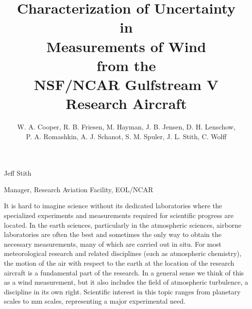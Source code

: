 \documentclass[12pt,twoside,english]{article}\usepackage[]{graphicx}\usepackage[]{color}
\begin{document}
\title{Characterization of Uncertainty \\
 in \\Measurements of Wind\\
 from the \\NSF/NCAR Gulfstream V Research Aircraft}


\author{W. A. Cooper, R. B. Friesen, M. Hayman, J. B. Jensen, D. H. Lenschow, \\P. A. Romashkin, A. J. Schanot, S. M. Spuler, J. L. Stith, C. Wolff}


\thispagestyle{empty}
\maketitle
\vfill{}
\eject%
\cleardoublepage
{}



\renewcommand{\contentsname}{Table of Contents}
{}
\tableofcontents{}
\clearpage
{}
{}
\listoffigures
\clearpage
{}
{}
\listoftables
\cleardoublepage
{}
{}
\subsection*{}
{\centering
Jeff Stith
\par}

{\centering
Manager, Research Aviation Facility, EOL/NCAR
\par}


\bigskip

It is hard to imagine science without its dedicated laboratories where
the specialized experiments and measurements required for scientific
progress are located. In the earth sciences, particularly in the
atmospheric sciences, airborne laboratories are often the best and
sometimes the only way to obtain the necessary measurements, many of
which are carried out in situ. For most meteorological research and
related disciplines (such as atmospheric chemistry), the motion of the
air with respect to the earth at the location of the research aircraft
is a fundamental part of the research. In a general sense we think
of this as a wind measurement, but it also includes the field of
atmospheric turbulence, a discipline in its own right. Scientific
interest in this topic ranges from planetary scales to mm scales,
representing a major experimental need. 
\end{document}
